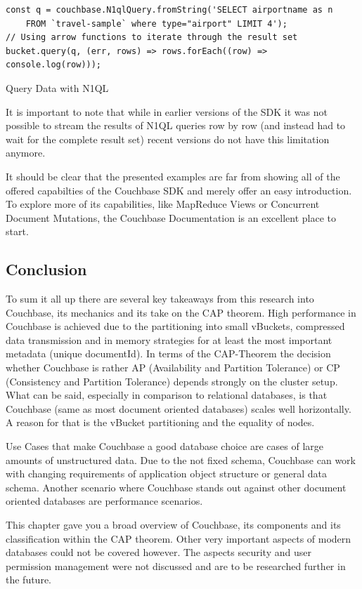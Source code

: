 \begin{listing}[ht]
\begin{verbatim}
const q = couchbase.N1qlQuery.fromString('SELECT airportname as n
    FROM `travel-sample` where type="airport" LIMIT 4');
// Using arrow functions to iterate through the result set
bucket.query(q, (err, rows) => rows.forEach((row) => console.log(row)));
\end{verbatim}
\caption{Query Data with N1QL}
\label{couchbaseSDKN1QL}
\end{listing}
\newpage
It is important to note that while in earlier versions of the SDK it was not possible to stream the results of N1QL queries row by row (and instead had to wait for the complete result set) recent versions do not have this limitation anymore.

It should be clear that the presented examples are far from showing all of the offered capabilties of the Couchbase SDK and merely offer an easy introduction. To explore more of its capabilities, like MapReduce Views or Concurrent Document Mutations, the Couchbase Documentation is an excellent place to start.

\subsection{Conclusion}
To sum it all up there are several key takeaways from this research into Couchbase, its mechanics and its take on the CAP theorem. High performance in Couchbase is achieved due to the partitioning into small vBuckets, compressed data transmission and in memory strategies for at least the most important metadata (unique documentId). In terms of the CAP-Theorem the decision whether Couchbase is rather AP (Availability and Partition Tolerance) or CP (Consistency and Partition Tolerance) depends strongly on the cluster setup. What can be said, especially in comparison to relational databases, is that Couchbase (same as most document oriented databases) scales well horizontally. A reason for that is the vBucket partitioning and the equality of nodes.

Use Cases that make Couchbase a good database choice are cases of large amounts of unstructured data. Due to the not fixed schema, Couchbase can work with changing requirements of application object structure or general data schema. Another scenario where Couchbase stands out against other document oriented databases are performance scenarios.

This chapter gave you a broad overview of Couchbase, its components and its classification within the CAP theorem. Other very important aspects of modern databases could not be covered however. The aspects security and user permission management were not discussed and are to be researched further in the future.